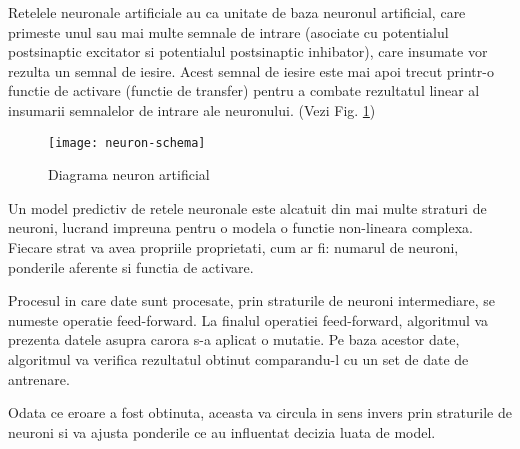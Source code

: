 	
	Retelele neuronale artificiale au ca unitate de baza neuronul artificial, care primeste unul sau mai multe semnale de intrare (asociate cu potentialul postsinaptic excitator si potentialul postsinaptic inhibator), care insumate vor rezulta un semnal de iesire. Acest semnal de iesire este mai apoi trecut printr-o functie de activare (functie de transfer) pentru a combate rezultatul linear al insumarii semnalelor de intrare ale neuronului. (Vezi Fig. \ref{fig:neuron-schema})
	
	\begin{figure}[H]
		\texttt{[image: neuron-schema]}  
		\caption{\label{fig:neuron-schema} Diagrama neuron artificial 
		\protect 
		\footnotemark}
	\end{figure}
	
	
	Un model predictiv de retele neuronale este alcatuit din mai multe straturi de neuroni, lucrand impreuna pentru o modela o functie non-lineara complexa.
	Fiecare strat va avea propriile proprietati, cum ar fi: numarul de neuroni, ponderile aferente si functia de activare.
	
	Procesul in care date sunt procesate, prin straturile de neuroni intermediare, se numeste operatie feed-forward. La finalul operatiei feed-forward, algoritmul va prezenta datele asupra carora s-a aplicat o mutatie. Pe baza acestor date, algoritmul va verifica rezultatul obtinut comparandu-l cu un set de date de antrenare. 
	
	Odata ce eroare a fost obtinuta, aceasta va circula in sens invers prin straturile de neuroni si va ajusta ponderile ce au influentat decizia luata de model.
	
	

